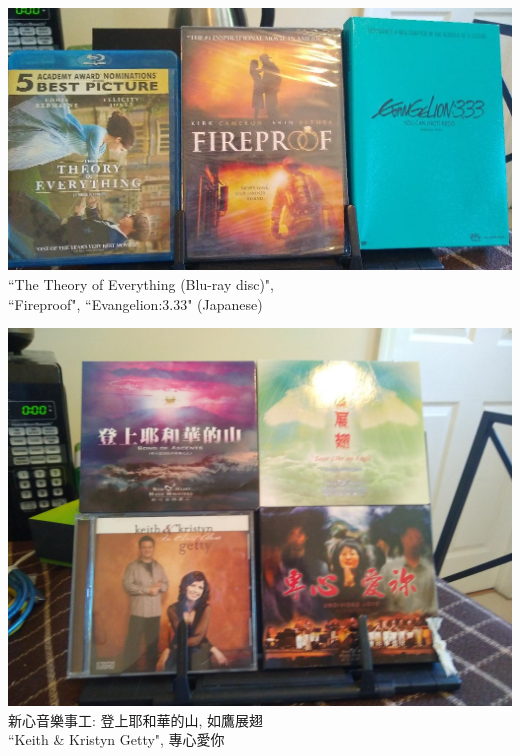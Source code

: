 \documentclass[t]{beamer}
\newcommand{\htarget}[2]{\hypertarget{#1}{#2}}
\begin{document}
\begin{frame}\htarget{theory}{} \begin{center}
\includegraphics[width=\textwidth]{dvd05_mini.jpg} \\
``The Theory of Everything (Blu-ray disc)", \\
``Fireproof", ``Evangelion:3.33" (Japanese)
\end{center} \end{frame}
\begin{frame}\htarget{getty}{} \begin{center}
\includegraphics[height=0.8\textheight]{dvd06_mini.jpg} \\
新心音樂事工: 登上耶和華的山, 如鷹展翅 \\
``Keith \& Kristyn Getty", 專心愛你
\end{center} \end{frame}
\end{document}
